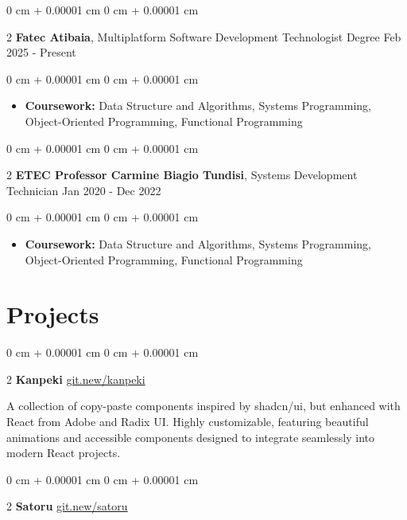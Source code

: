 \documentclass[10pt, letterpaper]{article}
\newenvironment{highlights}{ \begin{itemize}[ topsep=0.10 cm, parsep=0.10 cm, partopsep=0pt,
itemsep=0pt, leftmargin=0 cm + 10pt ] }{ \end{itemize} } %
\newenvironment{onecolentry}{ \begin{adjustwidth}{ 0 cm + 0.00001 cm }{ 0 cm + 0.00001 cm }
}{ \end{adjustwidth} } %
\newenvironment{twocolentry}[2][]{ \onecolentry \def\secondColumn{#2} \setcolumnwidth{\fill, 4.5 cm}
\begin{paracol}{2} }{ \switchcolumn \raggedleft \secondColumn \end{paracol}
\endonecolentry } %
\begin{document}
	\begin{twocolentry}
		{ Feb 2025 - Present } \textbf{Fatec Atibaia}, Multiplatform Software Development Technologist Degree
	\end{twocolentry}

	\vspace{0.10 cm}
	\begin{onecolentry}
		\begin{highlights}
			\item \textbf{Coursework:} Data Structure and Algorithms, Systems Programming,
			Object-Oriented Programming, Functional Programming
		\end{highlights}
	\end{onecolentry}

	\begin{twocolentry}
		{ Jan 2020 - Dec 2022 } \textbf{ETEC Professor Carmine Biagio Tundisi}, Systems
		Development Technician
	\end{twocolentry}

	\vspace{0.10 cm}
	\begin{onecolentry}
		\begin{highlights}
			\item \textbf{Coursework:} Data Structure and Algorithms, Systems Programming,
			Object-Oriented Programming, Functional Programming
		\end{highlights}
	\end{onecolentry}

	\section{Projects}

	\begin{twocolentry}
		{\href{https://git.new/kanpeki}{git.new/kanpeki}} \textbf{Kanpeki}
	\end{twocolentry}

	\vspace{0.10cm}
	A collection of copy-paste components inspired by shadcn/ui, but enhanced with
	React from Adobe and Radix UI. Highly customizable, featuring beautiful
	animations and accessible components designed to integrate seamlessly into
	modern React projects.

	\vspace{0.2cm}

	\begin{twocolentry}
		{\href{https://git.new/satoru}{git.new/satoru}} \textbf{Satoru}
	\end{twocolentry}
\end{document}
